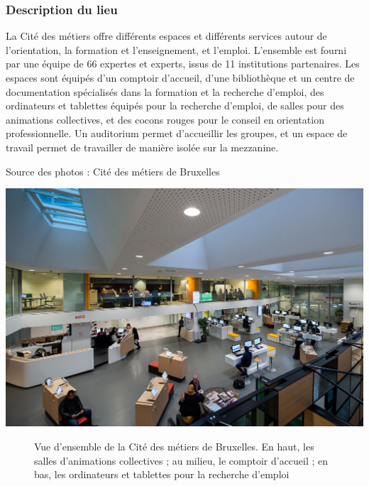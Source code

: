 \documentclass[french,a4paper,12pt]{article}
\begin{document}
\subsubsection{Description du lieu}

\quad La Cité des métiers offre différents espaces et différents services autour de l’orientation, la formation et l’enseignement, et l’emploi. L’ensemble est fourni par une équipe de 66 expertes et experts, issus de 11 institutions partenaires. 
Les espaces sont équipés d’un comptoir d’accueil, d’une bibliothèque et un centre de documentation spécialisés dans la formation et la recherche d’emploi, des ordinateurs et tablettes équipés pour la recherche d’emploi, de salles pour des animations collectives, et des cocons rouges pour le conseil en orientation professionnelle. Un auditorium permet d’accueillir les groupes, et un espace de travail permet de travailler de manière isolée sur la mezzanine.

Source des photos : Cité des métiers de Bruxelles

\begin{center}
\includegraphics[scale=1]{1-cdm-vue_generale.JPG}
\begin{figure}[h]
\caption{Vue d'ensemble de la Cité des métiers de Bruxelles. En haut, les salles d'animations collectives ; au milieu, le comptoir d’accueil ; en bas, les ordinateurs et tablettes pour la recherche d'emploi}
\end{figure}
\end{center}
\end{document}
